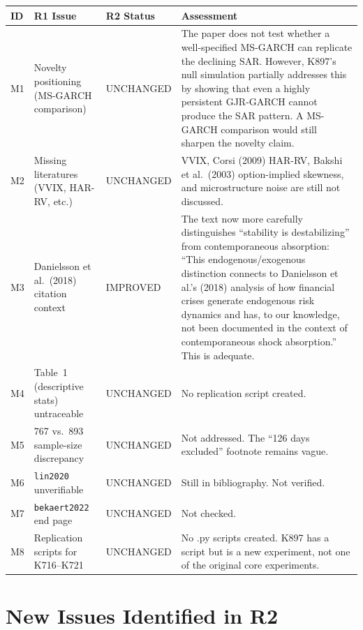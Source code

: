 \documentclass[12pt,a4paper]{article}
\begin{document}
\begin{longtable}{p{1cm}p{5cm}p{2.5cm}p{5.5cm}}
\toprule
\textbf{ID} & \textbf{R1 Issue} & \textbf{R2 Status} & \textbf{Assessment} \\
\midrule
\endfirsthead
M1 & Novelty positioning (MS-GARCH comparison) & \textcolor{warncolor}{UNCHANGED} & The paper does not test whether a well-specified MS-GARCH can replicate the declining SAR. However, K897's null simulation partially addresses this by showing that even a highly persistent GJR-GARCH cannot produce the SAR pattern. A MS-GARCH comparison would still sharpen the novelty claim. \\
\addlinespace
M2 & Missing literatures (VVIX, HAR-RV, etc.) & \textcolor{warncolor}{UNCHANGED} & VVIX, Corsi (2009) HAR-RV, Bakshi et al.\ (2003) option-implied skewness, and microstructure noise are still not discussed. \\
\addlinespace
M3 & Danielsson et al.\ (2018) citation context & \textcolor{okgreen}{IMPROVED} & The text now more carefully distinguishes ``stability is destabilizing'' from contemporaneous absorption: ``This endogenous/exogenous distinction connects to Danielsson et al.'s (2018) analysis of how financial crises generate endogenous risk dynamics and has, to our knowledge, not been documented in the context of contemporaneous shock absorption.'' This is adequate. \\
\addlinespace
M4 & Table~1 (descriptive stats) untraceable & \textcolor{warncolor}{UNCHANGED} & No replication script created. \\
\addlinespace
M5 & 767 vs.\ 893 sample-size discrepancy & \textcolor{warncolor}{UNCHANGED} & Not addressed. The ``126 days excluded'' footnote remains vague. \\
\addlinespace
M6 & \texttt{lin2020} unverifiable & \textcolor{warncolor}{UNCHANGED} & Still in bibliography. Not verified. \\
\addlinespace
M7 & \texttt{bekaert2022} end page & \textcolor{warncolor}{UNCHANGED} & Not checked. \\
\addlinespace
M8 & Replication scripts for K716--K721 & \textcolor{warncolor}{UNCHANGED} & No .py scripts created. K897 has a script but is a new experiment, not one of the original core experiments. \\
\bottomrule
\end{longtable}


\bigskip

\section*{New Issues Identified in R2}
\end{document}
